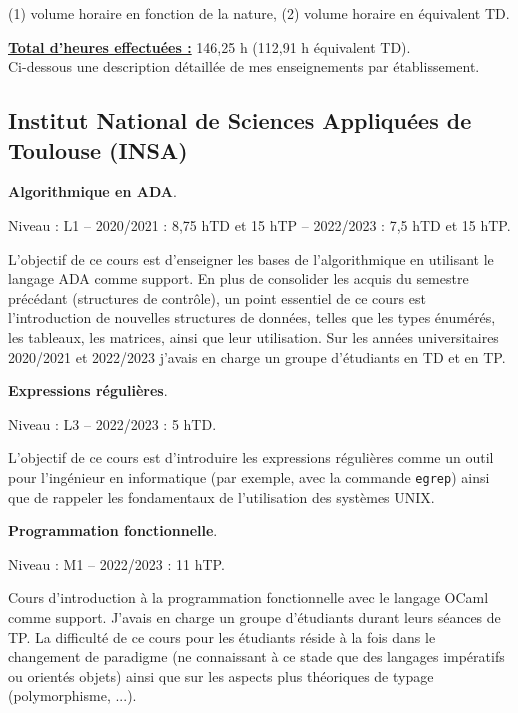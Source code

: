 (1) volume horaire en fonction de la nature, (2) volume horaire en équivalent TD.

\vspace{10pt}

\underline{\textbf{Total d'heures effectuées :}} 146,25 h (112,91 h équivalent TD).\\

Ci-dessous une description détaillée de mes enseignements par établissement.\\

\subsection{Institut National de Sciences Appliquées de Toulouse (INSA)}

\vspace{10pt}
\textbf{Algorithmique en ADA}.\medbreak 

Niveau : L1 -- 2020/2021 : 8,75 hTD et 15 hTP -- 2022/2023 : 7,5 hTD et 15 hTP.
\begin{mdframed}
  L'objectif de ce cours est d'enseigner les bases de l'algorithmique en utilisant
  le langage ADA comme support. En plus de consolider les acquis du semestre
  précédant (structures de contrôle), un point essentiel de ce cours est
  l'introduction de nouvelles structures de données, telles que les types
  énumérés, les tableaux, les matrices, ainsi que leur utilisation. Sur les années
  universitaires 2020/2021 et 2022/2023 j'avais en charge un groupe d'étudiants en
  TD et en TP. 
\end{mdframed}

\vspace{10pt}
\textbf{Expressions régulières}.\medbreak 

Niveau : L3 -- 2022/2023 : 5 hTD.
\begin{mdframed}
  L'objectif de ce cours est d'introduire les expressions régulières comme un
  outil pour l'ingénieur en informatique (par exemple, avec la commande
  \texttt{egrep}) ainsi que de rappeler les fondamentaux de l'utilisation des
  systèmes UNIX.
\end{mdframed}
\newpage
\vspace{10pt}
\textbf{Programmation fonctionnelle}.\medbreak

Niveau : M1 -- 2022/2023 : 11 hTP.
\begin{mdframed}
  Cours d'introduction à la programmation fonctionnelle avec le langage OCaml
  comme support. J'avais en charge un groupe d'étudiants durant leurs séances de
  TP. La difficulté de ce cours pour les étudiants réside à la fois dans le changement de
  paradigme (ne connaissant à ce stade que des langages impératifs ou orientés
  objets) ainsi que sur les aspects plus théoriques de typage (polymorphisme,
  ...).  
\end{mdframed}


